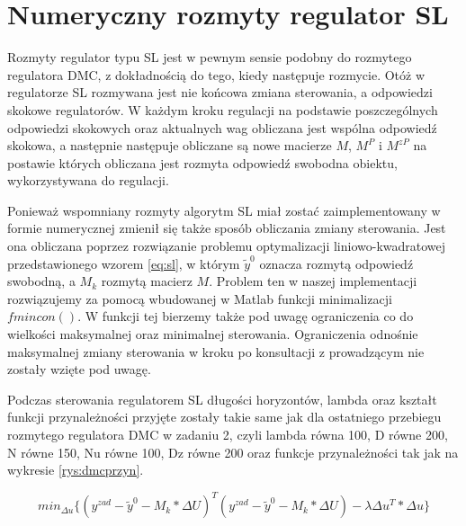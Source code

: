 \chapter{Numeryczny rozmyty regulator SL}
	Rozmyty regulator typu SL jest w pewnym sensie podobny do rozmytego regulatora DMC, z dokładnością do tego, kiedy następuje rozmycie. Otóż w regulatorze SL rozmywana jest nie końcowa zmiana sterowania, a odpowiedzi skokowe regulatorów. W każdym kroku regulacji na podstawie poszczególnych odpowiedzi skokowych oraz aktualnych wag obliczana jest wspólna odpowiedź skokowa, a następnie następuje obliczane są nowe macierze $M$, $M^P$ i $M^{zP}$ na postawie których obliczana jest rozmyta odpowiedź swobodna obiektu, wykorzystywana do regulacji.
	
	Ponieważ wspomniany rozmyty algorytm SL miał zostać zaimplementowany w formie numerycznej zmienił się także sposób obliczania zmiany sterowania. Jest ona obliczana poprzez rozwiązanie problemu optymalizacji liniowo-kwadratowej przedstawionego wzorem \ref{eq:sl}, w którym $\tilde{y}^0$ oznacza rozmytą odpowiedź swobodną, a $M_k$ rozmytą macierz $M$. Problem ten w naszej implementacji rozwiązujemy za pomocą wbudowanej w Matlab funkcji minimalizacji $fmincon()$. W funkcji tej bierzemy także pod uwagę ograniczenia co do wielkości maksymalnej oraz minimalnej sterowania. Ograniczenia odnośnie maksymalnej zmiany sterowania w kroku po konsultacji z prowadzącym nie zostały wzięte pod uwagę.
	
	Podczas sterowania regulatorem SL długości horyzontów, lambda oraz kształt funkcji przynależności przyjęte zostały takie same jak dla ostatniego przebiegu rozmytego regulatora DMC w zadaniu 2, czyli lambda równa 100, D równe 200, N równe 150, Nu równe 100, Dz równe 200 oraz funkcje przynależności tak jak na wykresie \ref{rys:dmcprzyn}.
	
	\begin{equation}
		min_{\Delta u}\{(y^{zad}-\tilde{y}^0-M_k*\Delta U)^T(y^{zad}-\tilde{y}^0-M_k*\Delta U)-\lambda \Delta u^T*\Delta u\}
		\label{eq:sl}
	\end{equation}